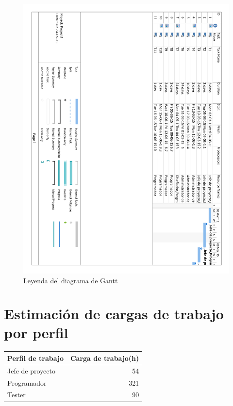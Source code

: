 \begin{figure}[!htp]
	\centering
	\includegraphics[page=4, scale=.7]{fig/real_gantt_diagram}
	\caption{Leyenda del diagrama de Gantt}
\end{figure}

\FloatBarrier

\section{Estimación de cargas de trabajo por perfil}

\begin{center}
	\begin{tabular}{|l|r|}
		\hline
		Perfil de trabajo & Carga de trabajo(h) \\ \hline
		Jefe de proyecto & 54 \\ \hline
		Programador & 321 \\ \hline
		Tester & 90 \\ \hline
		\hline
	\end{tabular}
\end{center}


